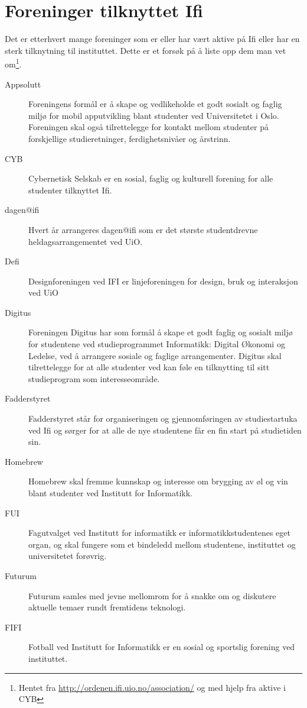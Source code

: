 \chapter{Foreninger tilknyttet Ifi}

Det er etterhvert mange foreninger som er eller har vært aktive på Ifi eller har en sterk tilknytning til instituttet. Dette er et forsøk på å liste opp dem man vet om\footnote{Hentet fra \url{http://ordenen.ifi.uio.no/association/} og med hjelp fra aktive i CYB}.

\begin{description}
	\item[Appsolutt] Foreningens formål er å skape og vedlikeholde et godt sosialt og faglig miljø for mobil apputvikling blant studenter ved Universitetet i Oslo. Foreningen skal også tilrettelegge for kontakt mellom studenter på forskjellige studieretninger, ferdighetsnivåer og årstrinn.
	\item[CYB] Cybernetisk Selskab er en sosial, faglig og kulturell forening for alle studenter tilknyttet Ifi.
	\item[dagen@ifi] Hvert år arrangeres dagen@ifi som er det største studentdrevne heldagsarrangementet ved UiO.
	\item[Defi] Designforeningen ved IFI er linjeforeningen for design, bruk og interaksjon ved UiO
	\item[Digitus] Foreningen Digitus har som formål å skape et godt faglig og sosialt miljø for studentene ved studieprogrammet Informatikk: Digital Økonomi og Ledelse, ved å arrangere sosiale og faglige arrangementer. Digitus skal tilrettelegge for at alle studenter ved kan føle en tilknytting til sitt studieprogram som interesseområde.
	\item[Fadderstyret] Fadderstyret står for organiseringen og gjennomføringen av studiestartuka ved Ifi og sørger for at alle de nye studentene får en fin start på studietiden sin.
	\item[Homebrew] Homebrew skal fremme kunnskap og interesse om brygging av øl og vin blant studenter ved Institutt for Informatikk.
	\item[FUI] Fagutvalget ved Institutt for informatikk er informatikkstudentenes eget organ, og skal fungere som et bindeledd mellom studentene, instituttet og universitetet forøvrig.
	\item[Futurum] Futurum samles med jevne mellomrom for å snakke om og diskutere aktuelle temaer rundt fremtidens teknologi.
	\item[FIFI] Fotball ved Institutt for Informatikk er en sosial og sportslig forening ved instituttet.

\end{description}
